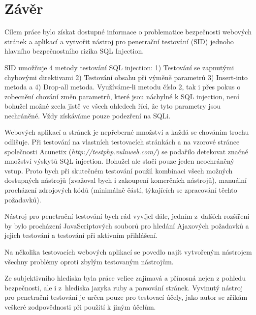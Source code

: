 \chapter{Závěr}
Cílem práce bylo získat dostupné informace o problematice bezpečnosti webových stránek a aplikací a vytvořit nástroj pro penetrační testování (SID) jednoho hlavního bezpečnostního rizika SQL Injection.

SID umožňuje 4 metody testování SQL injection: 1) Testování se zapnutými chybovými direktivami 2) Testování obsahu při výměně parametrů 3) Insert-into metoda a 4) Drop-all metoda. Využíváme-li metodu číslo 2, tak i přes pokus o zobecnění chování změn parametrů, které jsou náchylné k SQL injection, není bohužel možné zcela jistě ve všech ohledech říci, že tyto parametry jsou nechráněné. Vždy získáváme pouze podezření na SQLi.  

Webových aplikací a stránek je nepřeberné množství a každá se chováním trochu odlišuje. Při testování na vlastních testovacích stránkách a na vzorové stránce společnosti Acunetix (\textit{http://testphp.vulnweb.com/}) se podařilo detekovat značné množství výskytů SQL injection. Bohužel ale stačí pouze jeden neochráněný vstup. Proto bych při skutečném testování použil kombinaci všech možných dostupných nástrojů (zvažoval bych i zakoupení komerčních nástrojů), manuální procházení zdrojových kódů (minimálně částí, týkajících se zpracování těchto požadavků). 

Nástroj pro penetrační testování bych rád vyvíjel dále, jedním z~dalších rozšíření by bylo procházení JavaScriptových souborů pro hledání Ajaxových požadavků a jejich testování a testování při aktivním přihlášení. 

Na několika testovacích webových aplikací se povedlo najít vytvořeným nástrojem všechny problémy oproti zbylým testovaným nástrojům.

Ze subjektivního hlediska byla práce velice zajímavá a přínosná nejen z pohledu bezpečnosti, ale i z~hlediska jazyka ruby a parsování stránek. Vyvinutý nástroj pro penetrační testování je určen pouze pro testovací účely, jako autor se zříkám veškeré zodpovědnosti při použití k jiným účelům.